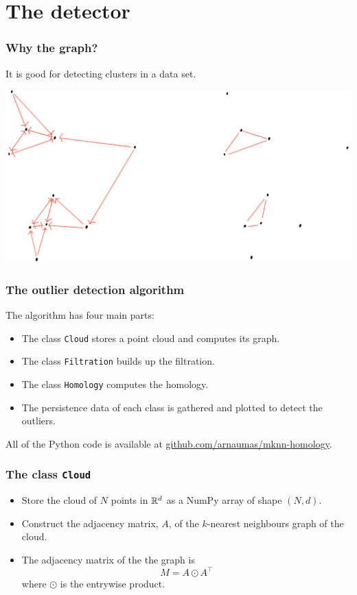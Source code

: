 \documentclass[xcolor=dvipsnames]{beamer}
\begin{document}
\section{The detector}
\begin{frame}
	\frametitle{Why the \MKNN graph?}
	It is good for detecting clusters in a data set. 
	\begin{center}
		\includegraphics[width=\textwidth]{drawings/mknn}
	\end{center}
\end{frame}

\begin{frame}
	\frametitle{The outlier detection algorithm}
	The algorithm has four main parts: \pause
	\begin{itemize}
		\item The class \texttt{Cloud} stores a point cloud and computes its \MKNN graph.
			\pause
		\item The class \texttt{Filtration} builds up the filtration. \pause
		\item The class \texttt{Homology} computes the homology. \pause
		\item The persistence data of each class is gathered and plotted to detect the
			outliers. 
	\end{itemize}
	\pause
	All of the Python code is available at \url{github.com/arnaumas/mknn-homology}. 
\end{frame}

\begin{frame}
	\frametitle{The class \texttt{Cloud}}
	\begin{itemize}
		\item Store the cloud of \( N \) points in \( \mathbb{R}^d \) as a NumPy array of shape \(
			(N,d) \). \pause
		\item Construct the adjacency matrix, \( A \), of the \( k \)-nearest neighbours graph
			of the cloud. \pause
		\item The adjacency matrix of the the \MKNN graph is
			\begin{equation*}
				M = A \odot A^\top
			\end{equation*}
			where \( \odot \) is the entrywise product.
	\end{itemize}
\end{frame}
\end{document}
